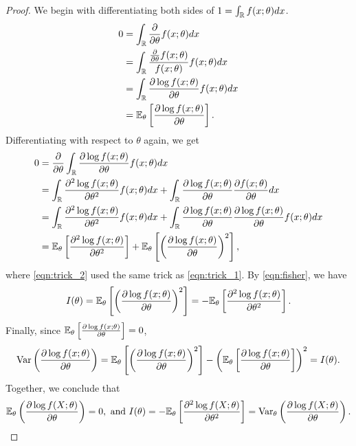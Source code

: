 \begin{proof}
We begin with differentiating both sides of $1 = \int_{\mathbb{R}} f(x;\theta) dx$.
\begin{align}
0 &= \int_{\mathbb{R}} \frac{\partial}{\partial\theta} f(x;\theta)dx\nonumber\\
&= \int_{\mathbb{R}} \frac{\frac{\partial}{\partial\theta} f(x;\theta)}{f(x;\theta)}f(x;\theta) dx\nonumber\\
&= \int_{\mathbb{R}} \frac{\partial \log f(x;\theta)}{\partial\theta}f(x;\theta) dx \label{eqn:trick_1} \\
&= \mathbb{E}_\theta\left[ \frac{\partial \log f(x;\theta)}{\partial\theta} \right]\nonumber.
\end{align}
Differentiating with respect to $\theta$ again, we get
\begin{align}
0 &= \frac{\partial}{\partial\theta}\int_{\mathbb{R}} \frac{\partial \log f(x;\theta)}{\partial\theta}f(x;\theta) dx\nonumber\\
&= \int_{\mathbb{R}} \frac{\partial^2 \log f(x;\theta)}{\partial\theta^2}f(x;\theta) dx + \int_{\mathbb{R}} \frac{\partial \log f(x;\theta)}{\partial\theta}\frac{\partial f(x;\theta)}{\partial\theta} dx\nonumber\\
&= \int_{\mathbb{R}} \frac{\partial^2 \log f(x;\theta)}{\partial\theta^2}f(x;\theta) dx + \int_{\mathbb{R}} \frac{\partial \log f(x;\theta)}{\partial\theta}\frac{\partial \log f(x;\theta)}{\partial\theta}f(x;\theta) dx \label{eqn:trick_2} \\
&= \mathbb{E}_\theta\left[ \frac{\partial^2 \log f(x;\theta)}{\partial\theta^2} \right] + \mathbb{E}_\theta\left[ \left(\frac{\partial \log f(x;\theta)}{\partial\theta}\right)^2 \right],\nonumber
\end{align}
where \cref{eqn:trick_2} used the same trick as \cref{eqn:trick_1}. By \cref{eqn:fisher}, we have
\begin{align*}
I(\theta) = \mathbb{E}_\theta\left[ \left(\frac{\partial \log f(x;\theta)}{\partial\theta}\right)^2 \right] = -\mathbb{E}_\theta\left[ \frac{\partial^2 \log f(x;\theta)}{\partial\theta^2} \right].
\end{align*}
Finally, since $\mathbb{E}_\theta\left[ \frac{\partial \log f(x;\theta)}{\partial\theta} \right] = 0$,
\begin{align*}
\text{Var}\left( \frac{\partial \log f(x;\theta)}{\partial\theta} \right) = \mathbb{E}_\theta\left[ \left(\frac{\partial \log f(x;\theta)}{\partial\theta}\right)^2 \right] - \left( \mathbb{E}_\theta\left[ \frac{\partial \log f(x;\theta)}{\partial\theta} \right] \right)^2 = I(\theta).
\end{align*}
Together, we conclude that
\begin{align*}
\mathbb{E}_\theta\left( \frac{\partial\log f(X;\theta)}{\partial \theta} \right) = 0, \text{ and }
I(\theta) = -\mathbb{E}_\theta\left[ \frac{\partial^2\log f(X;\theta)}{\partial \theta^2} \right] = \text{Var}_\theta\left( \frac{\partial\log f(X;\theta)}{\partial \theta} \right).
\end{align*}
\end{proof}
